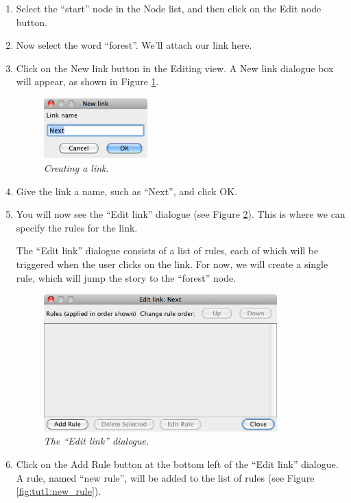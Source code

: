 \documentclass{article}
\begin{document}
\begin{enumerate}
  \item Select the ``start'' node in the Node list, and then click on the Edit
  node button.
  \item Now select the word ``forest''. We'll attach our link here.
  \item Click on the New link button in the Editing view. A New link dialogue
  box will appear, as shown in Figure \ref{fig:tut1:create_link}.

\begin{figure}[ht]
  \centering
  \includegraphics[width=4cm]{images/hypedyn-tutorial-1-figure-7}
  \caption{\textit{Creating a link.}}
  \label{fig:tut1:create_link}
\end{figure} 

\item Give the link a name, such as ``Next'', and click OK. \item You will now
see the ``Edit link'' dialogue (see Figure \ref{fig:tut1:edit_link_1}). This is where
we can specify the rules for the link.

The ``Edit link'' dialogue consists of a list of rules, each of which will be
triggered when the user clicks on the link. For now, we will create a single
rule, which will jump the story to the ``forest'' node.

\begin{figure}[ht]
  \centering
  \includegraphics[width=9cm]{images/hypedyn-tutorial-1-figure-8}
  \caption{\textit{The ``Edit link'' dialogue.}}
  \label{fig:tut1:edit_link_1}
\end{figure} 

\item Click on the Add Rule button at the bottom left of the ``Edit link''
dialogue. A rule, named ``new rule'', will be added to the list of rules (see
Figure \ref{fig:tut1:new_rule}).


\end{enumerate}
\end{document}
